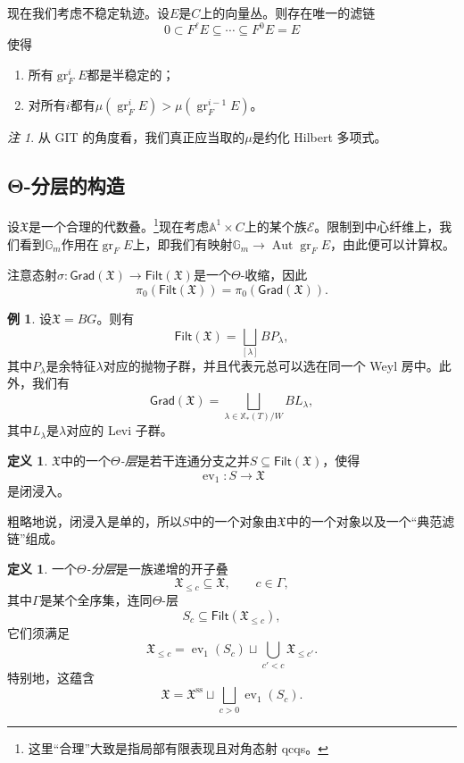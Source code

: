\documentclass{amsart}
\theoremstyle{definition}
\newtheorem{defn}[thm]{定义}
\newtheorem{exm}[thm]{例}
\theoremstyle{remark}
\newtheorem{rmk}[thm]{注}
\theoremstyle{plain}
\theoremstyle{definition}
\theoremstyle{remark}
\newcommand{\A}{\mathbb{A}}
\newcommand{\G}{\mathbb{G}}
\newcommand{\mc}[1]{\mathcal{#1}}
\newcommand{\mf}[1]{\mathfrak{#1}}
\newcommand{\mr}[1]{\mathrm{#1}}
\newcommand{\on}[1]{\operatorname{#1}}
\newcommand{\ms}[1]{\mathsf{#1}}
\newcommand{\1}{\mathbf{1}}
\newcommand{\2}{\mathbf{2}}
\newcommand{\3}{\mathbf{3}}
\DeclareMathOperator{\Aut}{Aut}
\DeclareMathOperator{\ev}{ev}
\begin{document}
现在我们考虑不稳定轨迹。设\(E\)是\(C\)上的向量丛。则存在唯一的滤链
\[ 0 \subset F^{\ell} E \subseteq \cdots \subseteq F^0 E = E \]
使得
\begin{enumerate}
    \item 所有\(\on{gr}_F^i E\)都是半稳定的；
    \item 对所有\(i\)都有\(\mu(\on{gr}_F^i E) > \mu(\on{gr}_F^{i-1} E)\)。
\end{enumerate}
\begin{rmk}
    从 GIT 的角度看，我们真正应当取的\(\mu\)是约化 Hilbert 多项式。
\end{rmk}

\subsection{Θ-分层的构造}%
\label{sub:Construction of Theta-stratifications}

设\(\mf{X}\)是一个合理的代数叠。\footnote{这里“合理”大致是指局部有限表现且对角态射 qcqs。}现在考虑\(\A^1 \times C\)上的某个族\(\mc{E}\)。限制到中心纤维上，我们看到\(\G_m\)作用在\(\on{gr}_F E\)上，即我们有映射\(\G_m \to \Aut \on{gr}_F E\)，由此便可以计算权。

注意态射\(\sigma \colon \ms{Grad}(\mf{X}) \to \ms{Filt}(\mf{X})\)是一个\(\Theta\)-收缩，因此
\[ \pi_0(\ms{Filt}(\mf{X})) = \pi_0(\ms{Grad}(\mf{X})). \]

\begin{exm}
    设\(\mf{X} = BG\)。则有
    \[\ms{Filt}(\mf{X}) = \bigsqcup_{[\lambda]} B P_{\lambda}, \]
    其中\(P_{\lambda}\)是余特征\(\lambda\)对应的抛物子群，并且代表元总可以选在同一个 Weyl 房中。此外，我们有
    \[ \ms{Grad}(\mf{X}) = \bigsqcup_{\lambda \in \mathbb{X}_*(T)/W} B L_{\lambda}, \]
    其中\(L_{\lambda}\)是\(\lambda\)对应的 Levi 子群。
\end{exm}

\begin{defn}
    \(\mf{X}\)中的一个\textit{\(\Theta\)-层}是若干连通分支之并\(S \subseteq \ms{Filt}(\mf{X})\)，使得
    \[ \ev_1 \colon S \to \mf{X} \]
    是闭浸入。
\end{defn}

粗略地说，闭浸入是单的，所以\(S\)中的一个对象由\(\mf{X}\)中的一个对象以及一个“典范滤链”组成。

\begin{defn}
    一个\textit{\(\Theta\)-分层}是一族递增的开子叠
    \[ \mf{X}_{\leq c} \subseteq \mf{X}, \qquad c \in \Gamma, \]
    其中\(\Gamma\)是某个全序集，连同\(\Theta\)-层
    \[ S_c \subseteq \ms{Filt}(\mf{X}_{\leq c}), \]
    它们须满足
    \[ \mf{X}_{\leq c} = \ev_1(S_c) \sqcup \bigcup_{c' < c} \mf{X}_{\leq c'}. \]
    特别地，这蕴含
    \[ \mf{X} = \mf{X}^{\mr{ss}} \sqcup \bigsqcup_{c > 0} \ev_1(S_c). \]
\end{defn}
\end{document}
